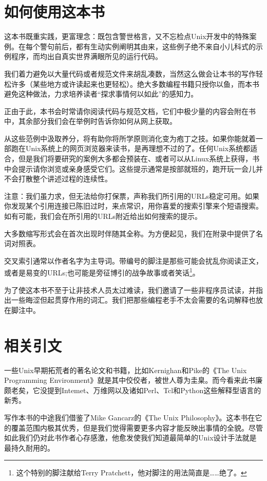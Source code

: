 \documentclass[12pt,oneside]{book}
\begin{document}
\begin{common-format}
\section{如何使用这本书}
这本书既重实践，更富理念：既包含警世格言，又不忘检点Unix开发中的特殊案例。在每个警句前后，都有生动实例阐明其由来，这些例子绝不来自小儿科式的示例程序，而均出自真实世界满眼所见的运行代码。

我们着力避免以大量代码或者规范文件来胡乱凑数，当然这么做会让本书的写作轻松许多（某些地方或许读起来也更轻松）。绝大多数编程书籍只授你以鱼，而本书避免这种做法，力求培养读者“探求事情何以如此”的感知力。

正由于此，本书会时常请你阅读代码与规范文档，它们中极少量的内容会附在书中，其余部分我们会在举例时告诉你如何从网上获取。

从这些范例中汲取养分，将有助你将所学原则消化变为疱丁之技。如果你能就着一部跑在Unix系统上的网页浏览器来读书，是再理想不过的了。任何Unix系统都适合，但是我们将要研究的案例大多都会预装在、或者可以从Linux系统上获得，书中会提示请你浏览或亲身感受它们。这些提示通常是按部就班的，跑开玩一会儿并不会打散整个讲述过程的连续性。

注意：我们虽力求，但无法给你打保票，声称我们所引用的URLs稳定可用。如果你发现某个引用连接已陈旧过时，来点常识，用你喜爱的搜索引擎来个短语搜索。如有可能，我们会在所引用的URLs附近给出如何搜索的提示。

大多数缩写形式会在首次出现时伴随其全称。为方便起见，我们在附录中提供了名词对照表。

交叉索引通常以作者名字为主导词。带编号的脚注是那些可能会扰乱你阅读正文，或者是易变的URLs;也可能是旁征博引的战争故事或者笑话\footnote{这个特别的脚注献给Terry Pratchett，他对脚注的用法简直是……绝了。}。

为了使这本书不至于让非技术人员太过难读，我们邀请了一些非程序员试读，并指出一些晦涩但起贯穿作用的词汇。我们把那些编程老手不太会需要的名词解释也放在脚注中。

\section{相关引文}
一些Unix早期拓荒者的著名论文和书籍，比如Kernighan和Pike的《The Unix Programming Environment》\cite{Kernighan-Pike84}就是其中佼佼者，被世人尊为圭臬。而今看来此书廉颇老矣，它没提到Intemet、万维网以及诸如Perl、Tcl和Python这些解释型语言的新秀。

写作本书的中途我们借鉴了Mike Gancarz的《The Unix Philosophy》\cite{Gancarz}。这本书在它的覆盖范围内极其优秀，但是我们觉得需要更多内容才能反映出事情的全貌。尽管如此我们仍对此书作者心存感激，他愈发使我们知道最简单的Unix设计手法就是最持久耐用的。


\end{common-format}
\end{document}
